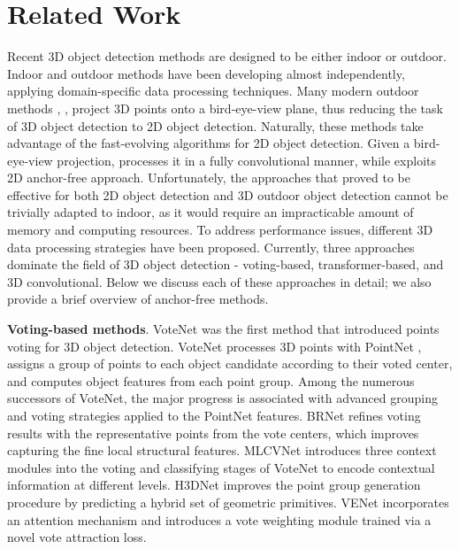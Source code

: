 \documentclass[runningheads]{llncs}
\begin{document}
\section{Related Work}

Recent 3D object detection methods are designed to be either indoor or outdoor. Indoor and outdoor methods have been developing almost independently, applying domain-specific data processing techniques. Many modern outdoor methods \cite{yan2018second}, \cite{lang2019pointpillars}, \cite{zhou2018voxelnet} project 3D points onto a bird-eye-view plane, thus reducing the task of 3D object detection to 2D object detection. Naturally, these methods take advantage of the fast-evolving algorithms for 2D object detection. Given a bird-eye-view projection, \cite{li20173d-fully-conv} processes it in a fully convolutional manner, while \cite{yin2021center-point} exploits 2D anchor-free approach. Unfortunately, the approaches that proved to be effective for both 2D object detection and 3D outdoor object detection cannot be trivially adapted to indoor, as it would require an impracticable amount of memory and computing resources. To address performance issues, different 3D data processing strategies have been proposed. Currently, three approaches dominate the field of 3D object detection - voting-based, transformer-based, and 3D convolutional. Below we discuss each of these approaches in detail; we also provide a brief overview of anchor-free methods.

\textbf{Voting-based methods}. VoteNet \cite{qi2019votenet} was the first method that introduced points voting for 3D object detection. VoteNet processes 3D points with PointNet \cite{qi2017pointnet}, assigns a group of points to each object candidate according to their voted center, and computes object features from each point group. Among the numerous successors of VoteNet, the major progress is associated with advanced grouping and voting strategies applied to the PointNet features. BRNet \cite{cheng2021brnet} refines voting results with the representative points from the vote centers, which improves capturing the fine local structural features. MLCVNet \cite{xie2020mlcvnet} introduces three context modules into the voting and classifying stages of VoteNet to encode contextual information at different levels. H3DNet \cite{zhang2020h3dnet} improves the point group generation procedure by predicting a hybrid set of geometric primitives. VENet \cite{xie2021venet} incorporates an attention mechanism and introduces a vote weighting module trained via a novel vote attraction loss.
\end{document}
